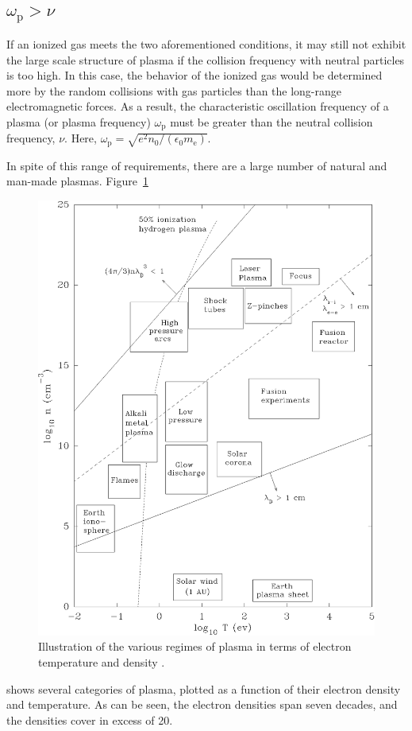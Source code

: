 \subsection{$\omega_\mathrm{p} > \nu$}
If an ionized gas meets the two aforementioned conditions, it may still
not exhibit the large scale structure of plasma if the collision
frequency with neutral particles is too high. In this case, the behavior
of the ionized gas would be determined more by the random collisions
with gas particles than the long-range electromagnetic forces. As a
result, the characteristic oscillation frequency of a plasma (or plasma
frequency) $\omega_\mathrm{p}$ must be greater than the neutral
collision frequency, $\nu$. Here, $\omega_\mathrm{p} =
\sqrt{e^2n_0/(\epsilon_0 m_\mathrm{e})}$.

In spite of this range of requirements, there are a large number of
natural and man-made plasmas. Figure~\ref{fig:regimes}
\begin{figure}
  \centering
  \includegraphics{./chapters/theory/figures/regimes.eps}
  \caption{Illustration of the various regimes of plasma in terms of
electron temperature and density \cite{Huba2011}.}
  \label{fig:regimes}
\end{figure}
shows several categories of plasma, plotted as a function of their
electron density and temperature. As can be seen, the electron densities
span seven decades, and the densities cover in excess of 20.

